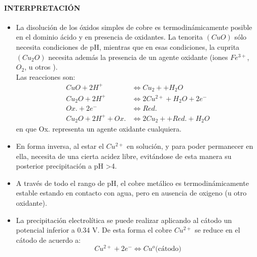\paragraph{INTERPRETACI\'ON}
\begin{itemize}
 \item La disoluci\'on de los \'oxidos simples de cobre es termodin\'amicamente posible en el dominio \'acido y en presencia de oxidantes. La tenorita $(CuO)$ s\'olo necesita condiciones de pH, mientras que en esas condiciones, la cuprita $(Cu_2O)$ necesita adem\'as la presencia de un agente oxidante (iones $Fe^{3+}$, $O_2$, u otros ).\\
 Las reacciones son:
 \begin{equation}
  \begin{align}
   CuO + 2 H^+	& \Longleftrightarrow	Cu_2+ + H_2O\\
   Cu_2O + 2H^+& \Longleftrightarrow 2Cu^{2+} + H_2O + 2e^-\\
   Ox. + 2 e^- & \Longleftrightarrow Red.\\
   Cu_2O + 2 H^+ + Ox. & \Longleftrightarrow	2 Cu_2+ + Red. + H_2O
  \end{align}
 \end{equation}
 en que Ox. representa un agente oxidante cualquiera.
 \item En forma inversa, al estar el $Cu^{2+}$ en soluci\'on, y para poder permanecer en ella, necesita de una cierta acidez libre, evit\'andose de esta manera su posterior precipitaci\'on a pH >4.
 \item A trav\'es de todo el rango de pH, el cobre met\'alico es termodin\'amicamente estable estando en contacto con agua, pero en ausencia de oxigeno (u otro oxidante).
 \item La precipitaci\'on electrol\'itica se puede realizar aplicando al c\'atodo un potencial inferior a 0.34 V. De esta forma el cobre $Cu^{2+}$ se reduce en el c\'atodo de acuerdo a:
 \begin{equation}
  Cu^{2+} + 2e^- \Longleftrightarrow Cu^o  \text{(c\'atodo)}
 \end{equation}
\end{itemize}

